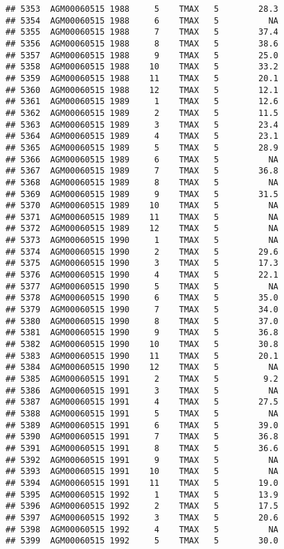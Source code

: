 \documentclass{article}\usepackage[]{graphicx}\usepackage[]{color}
\makeatletter
\newenvironment{kframe}{%
 \def\at@end@of@kframe{}%
 \ifinner\ifhmode%
  \def\at@end@of@kframe{\end{minipage}}%
  \begin{minipage}{\columnwidth}%
 \fi\fi%
 \def\FrameCommand##1{\hskip\@totalleftmargin \hskip-\fboxsep
 \colorbox{shadecolor}{##1}\hskip-\fboxsep
     \hskip-\linewidth \hskip-\@totalleftmargin \hskip\columnwidth}%
 \MakeFramed {\advance\hsize-\width
   \@totalleftmargin\z@ \linewidth\hsize
   \@setminipage}}%
 {\par\unskip\endMakeFramed%
 \at@end@of@kframe}
\newenvironment{knitrout}{}{} %
\makeatother
\begin{document}
\begin{knitrout}
\begin{kframe}
\begin{verbatim}
## 5353  AGM00060515 1988     5    TMAX   5        28.3
## 5354  AGM00060515 1988     6    TMAX   5          NA
## 5355  AGM00060515 1988     7    TMAX   5        37.4
## 5356  AGM00060515 1988     8    TMAX   5        38.6
## 5357  AGM00060515 1988     9    TMAX   5        25.0
## 5358  AGM00060515 1988    10    TMAX   5        33.2
## 5359  AGM00060515 1988    11    TMAX   5        20.1
## 5360  AGM00060515 1988    12    TMAX   5        12.1
## 5361  AGM00060515 1989     1    TMAX   5        12.6
## 5362  AGM00060515 1989     2    TMAX   5        11.5
## 5363  AGM00060515 1989     3    TMAX   5        23.4
## 5364  AGM00060515 1989     4    TMAX   5        23.1
## 5365  AGM00060515 1989     5    TMAX   5        28.9
## 5366  AGM00060515 1989     6    TMAX   5          NA
## 5367  AGM00060515 1989     7    TMAX   5        36.8
## 5368  AGM00060515 1989     8    TMAX   5          NA
## 5369  AGM00060515 1989     9    TMAX   5        31.5
## 5370  AGM00060515 1989    10    TMAX   5          NA
## 5371  AGM00060515 1989    11    TMAX   5          NA
## 5372  AGM00060515 1989    12    TMAX   5          NA
## 5373  AGM00060515 1990     1    TMAX   5          NA
## 5374  AGM00060515 1990     2    TMAX   5        29.6
## 5375  AGM00060515 1990     3    TMAX   5        17.3
## 5376  AGM00060515 1990     4    TMAX   5        22.1
## 5377  AGM00060515 1990     5    TMAX   5          NA
## 5378  AGM00060515 1990     6    TMAX   5        35.0
## 5379  AGM00060515 1990     7    TMAX   5        34.0
## 5380  AGM00060515 1990     8    TMAX   5        37.0
## 5381  AGM00060515 1990     9    TMAX   5        36.8
## 5382  AGM00060515 1990    10    TMAX   5        30.8
## 5383  AGM00060515 1990    11    TMAX   5        20.1
## 5384  AGM00060515 1990    12    TMAX   5          NA
## 5385  AGM00060515 1991     2    TMAX   5         9.2
## 5386  AGM00060515 1991     3    TMAX   5          NA
## 5387  AGM00060515 1991     4    TMAX   5        27.5
## 5388  AGM00060515 1991     5    TMAX   5          NA
## 5389  AGM00060515 1991     6    TMAX   5        39.0
## 5390  AGM00060515 1991     7    TMAX   5        36.8
## 5391  AGM00060515 1991     8    TMAX   5        36.6
## 5392  AGM00060515 1991     9    TMAX   5          NA
## 5393  AGM00060515 1991    10    TMAX   5          NA
## 5394  AGM00060515 1991    11    TMAX   5        19.0
## 5395  AGM00060515 1992     1    TMAX   5        13.9
## 5396  AGM00060515 1992     2    TMAX   5        17.5
## 5397  AGM00060515 1992     3    TMAX   5        20.6
## 5398  AGM00060515 1992     4    TMAX   5          NA
## 5399  AGM00060515 1992     5    TMAX   5        30.0

\end{verbatim}
\end{kframe}
\end{knitrout}
\end{document}
